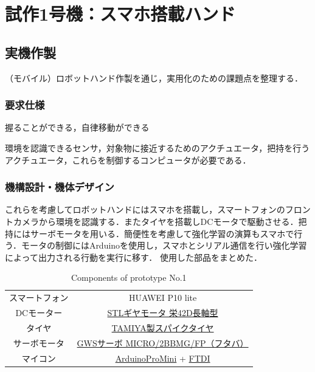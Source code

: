 \chapter{試作1号機：スマホ搭載ハンド}
\newpage

\section{実機作製}
（モバイル）ロボットハンド作製を通じ，実用化のための課題点を整理する．
\subsection{要求仕様}


握ることができる，自律移動ができる

環境を認識できるセンサ，対象物に接近するためのアクチュエータ，把持を行うアクチュエータ，これらを制御するコンピュータが必要である．



\subsection{機構設計・機体デザイン}

これらを考慮してロボットハンドにはスマホを搭載し，スマートフォンのフロントカメラから環境を認識する．またタイヤを搭載しDCモータで駆動させる．把持にはサーボモータを用いる．簡便性を考慮して強化学習の演算もスマホで行う．モータの制御にはArduinoを使用し，スマホとシリアル通信を行い強化学習によって出力される行動を実行に移す．
使用した部品をまとめた．

\begin{table}[H]
    \centering
    \caption{Components of prototype No.1}
    \begin{tabular}{cc}\toprule
        スマートフォン & HUAWEI P10 lite \\
        DCモーター & \href{http://akizukidenshi.com/catalog/g/gM-12379/}{STLギヤモータ 栄42D長軸型} \\
        タイヤ & \href{https://tamiya.com/japan/products/70194/index.html}{TAMIYA製スパイクタイヤ} \\ 
        サーボモータ & \href{http://akizukidenshi.com/catalog/g/gM-01908/}{GWSサーボ MICRO/2BBMG/FP（フタバ）} \\ 
        マイコン & \href{http://akizukidenshi.com/catalog/g/gK-10347/}{ArduinoProMini} + \href{https://www.switch-science.com/catalog/1032/}{FTDI} \\ \bottomrule
    \end{tabular} 
    \label{tab:1号機部品}
\end{table}

